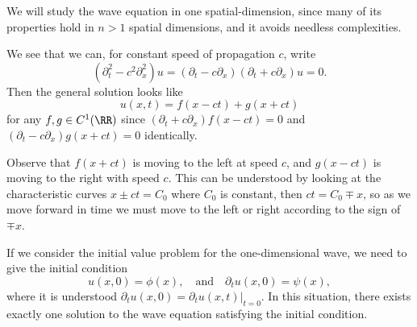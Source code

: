 \begin{node}\label{pde:wave-0007}%
We will study the wave equation in one spatial-dimension, since many of
its properties hold in $n>1$ spatial dimensions, and it avoids needless
complexities.

\begin{node}\label{pde:wave-0004}%
We see that we can, for constant speed of propagation $c$, write
\begin{equation}
(\partial_{t}^{2}-c^{2}\partial_{x}^{2})u=(\partial_{t}-c\partial_{x})
(\partial_{t}+c\partial_{x})u=0.
\end{equation}
Then the general solution looks like
\begin{equation}
u(x,t) = f(x-ct) + g(x+ct)
\end{equation}
for any $f,g\in C^{1}(\RR)$ since $(\partial_{t}+c\partial_{x})f(x-ct)=0$ and
$(\partial_{t}-c\partial_{x})g(x+ct)=0$ identically.

Observe that $f(x+ct)$ is moving to the left at speed $c$, and $g(x-ct)$
is moving to the right with speed $c$. This can be understood by looking
at the characteristic curves $x\pm ct=C_{0}$ where $C_{0}$ is constant,
then $ct=C_{0}\mp x$, so as we move forward in time we must move to the
left or right according to the sign of $\mp x$.
\end{node} %

\begin{node}\label{pde:wave-0005}%
If we consider the initial value problem for the one-dimensional wave,
we need to give the initial condition
\begin{equation}
u(x,0)=\phi(x),\quad\mbox{and}\quad\partial_{t}u(x,0)=\psi(x),
\end{equation}
where it is understood $\partial_{t}u(x,0)=\partial_{t}u(x,t)|_{t=0}$.
In this situation, there exists exactly one solution to the wave
equation satisfying the initial condition.


\end{node}
\end{node}
